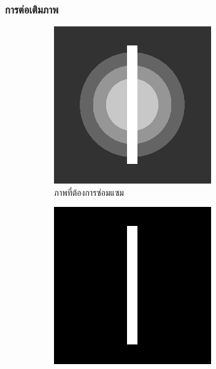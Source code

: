 \documentclass[xcolor=dvipsnames, xetex,serif]{beamer}
\numberwithin{equation}{section}
\begin{document}
		\begin{frame}
		\frametitle{การต่อเติมภาพ}
			\begin{figure}[H]
				\centering
				\begin{subfigure}{0.3\linewidth}
					\centering
					\includegraphics[width=0.8\linewidth]{images/grayscale_inpaint/toinpaint.png}
					\caption{ภาพที่ต้องการซ่อมแซม}
				\end{subfigure}
				\begin{subfigure}{0.3\linewidth}
					\centering
					\includegraphics[width=0.8\linewidth]{images/grayscale_inpaint/inpaintdomain.png}

\end{subfigure}
\end{figure}
\end{frame}
\end{document}
